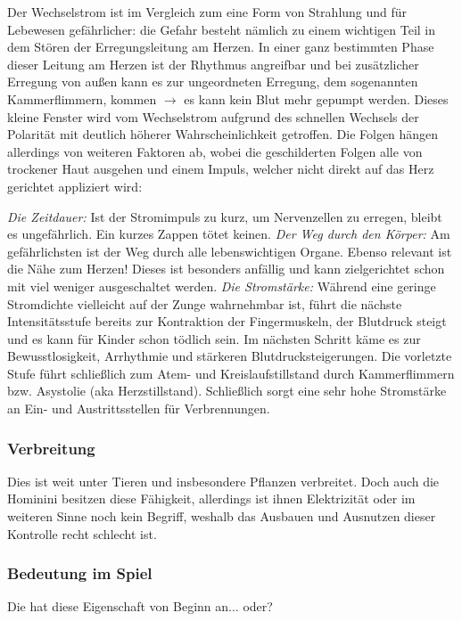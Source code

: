Der Wechselstrom ist im Vergleich zum  eine Form von Strahlung und für Lebewesen gefährlicher:
die Gefahr besteht nämlich zu einem wichtigen Teil in dem Stören der Erregungsleitung am Herzen.
In einer ganz bestimmten Phase dieser Leitung am Herzen ist der Rhythmus angreifbar und bei zusätzlicher Erregung von außen kann es zur ungeordneten Erregung, dem sogenannten Kammerflimmern, kommen $\rightarrow$ es kann kein Blut mehr gepumpt werden.
Dieses kleine Fenster wird vom Wechselstrom aufgrund des schnellen Wechsels der Polarität mit deutlich höherer Wahrscheinlichkeit getroffen.
Die Folgen hängen allerdings von weiteren Faktoren ab, wobei die geschilderten Folgen alle von trockener Haut ausgehen und einem Impuls, welcher nicht direkt auf das Herz gerichtet appliziert wird:
\begin{outline}
	\1 \textit{Die Zeitdauer:} Ist der Stromimpuls zu kurz, um Nervenzellen zu erregen, bleibt es ungefährlich.
	Ein kurzes Zappen tötet keinen.
	\1 \textit{Der Weg durch den Körper:} Am gefährlichsten ist der Weg durch alle lebenswichtigen Organe.
	Ebenso relevant ist die Nähe zum Herzen!
	Dieses ist besonders anfällig und kann zielgerichtet schon mit viel weniger ausgeschaltet werden.
	\1 \textit{Die Stromstärke:} Während eine geringe Stromdichte vielleicht auf der Zunge wahrnehmbar ist, führt die nächste Intensitätsstufe bereits zur Kontraktion der Fingermuskeln, der Blutdruck steigt und es kann für Kinder schon tödlich sein. 
	Im nächsten Schritt käme es zur Bewusstlosigkeit, Arrhythmie und stärkeren Blutdrucksteigerungen.
	Die vorletzte Stufe führt schließlich zum Atem- und Kreislaufstillstand durch Kammerflimmern bzw. Asystolie (aka Herzstillstand).
	Schließlich sorgt eine sehr hohe Stromstärke an Ein- und Austrittsstellen für Verbrennungen.
\end{outline}

\subsubsection{Verbreitung}
Dies ist weit unter Tieren und insbesondere Pflanzen verbreitet. 
Doch auch die Hominini besitzen diese Fähigkeit, allerdings ist ihnen Elektrizität oder im weiteren Sinne noch kein Begriff, weshalb das Ausbauen und Ausnutzen dieser Kontrolle recht schlecht ist.

\subsubsection{Bedeutung im Spiel}
Die  hat diese Eigenschaft von Beginn an... oder?

